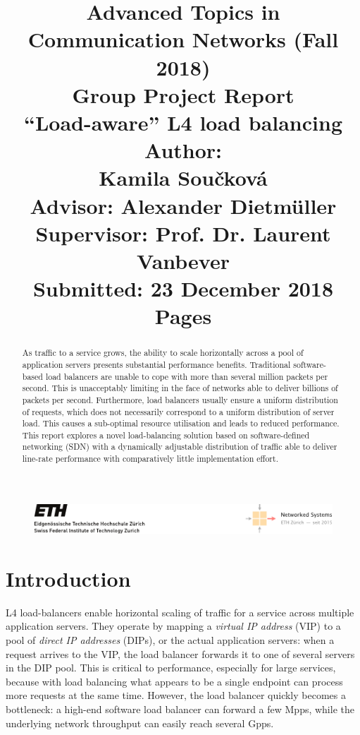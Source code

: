 \documentclass[11pt,oneside,a4paper]{article}
\title{
    \vspace*{0.0mm}
    \LARGE\bf\sf Advanced Topics in \\Communication Networks (Fall 2018)
    \vspace*{10.0mm} \\
    \Large\bf\sf Group Project Report \vspace*{30.0mm}\\
    \Huge\bf\sf ``Load-aware'' L4 load balancing
    \vspace*{30.0mm} \\
    \normalsize
    \sf Author:\\[5pt]
    \sf Kamila Sou\v{c}kov\'{a} \\ [5pt]
    \sf  Advisor:  Alexander Dietm\"{u}ller \vspace*{5mm}\\
    \sf  Supervisor:  Prof. Dr. Laurent Vanbever \vspace*{20.0mm}\\
    \sf Submitted: 23 December 2018\\ [5pt]
    \sf \pageref{lastpage} Pages
}
\date{}
\begin{document}
\begin{figure}
    \includegraphics[width=\textwidth]{figures/eth-nsg-header}
\end{figure}

\maketitle
\thispagestyle{empty}
\raggedbottom
\clearpage


\begin{abstract}
As traffic to a service grows, the ability to scale horizontally across a pool
of application servers presents substantial performance benefits.
Traditional software-based load balancers are unable to cope with more than
several million packets per second.
This is unacceptably limiting in the face of networks able to deliver billions
of packets per second.
Furthermore, load balancers usually ensure a uniform distribution of requests,
which does not necessarily correspond to a uniform distribution of server load.
This causes a sub-optimal resource utilisation and leads to reduced performance.
This report explores a novel load-balancing solution based on software-defined
networking (SDN) with a dynamically adjustable distribution of traffic able to
deliver line-rate performance with comparatively little implementation effort.
\end{abstract}

\clearpage
\setcounter{tocdepth}{2}
\tableofcontents
\clearpage
{}

\section{Introduction}
L4 load-balancers enable horizontal scaling of traffic for a service across
multiple application servers.
They operate by mapping a \emph{virtual IP address} (VIP) to a pool of
\emph{direct IP addresses} (DIPs), or the actual application servers: when a
request arrives to the VIP, the load balancer forwards it to one of several
servers in the DIP pool.
This is critical to performance, especially for large services, because with
load balancing what appears to be a single endpoint can process more requests at
the same time.
However, the load balancer quickly becomes a bottleneck: a high-end software
load balancer can forward a few Mpps, while the underlying network throughput
can easily reach several Gpps.\cite{maglev}
\end{document}
